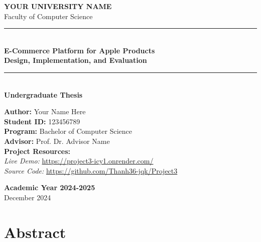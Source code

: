 \documentclass[12pt, a4paper]{report}
\begin{document}

\begin{titlepage}
    \centering
    \vspace*{2cm}
    
    {\LARGE \textbf{YOUR UNIVERSITY NAME}}\\[0.5cm]
    {\large Faculty of Computer Science}\\[2cm]
    
    \rule{\textwidth}{1.5pt}\\[0.4cm]
    {\Huge \textbf{E-Commerce Platform for Apple Products}}\\[0.2cm]
    {\Large \textbf{Design, Implementation, and Evaluation}}\\[0.4cm]
    \rule{\textwidth}{1.5pt}\\[2cm]
    
    {\Large \textbf{Undergraduate Thesis}}\\[1cm]
    
    \begin{flushleft}
        \large
        \textbf{Author:} Your Name Here\\
        \textbf{Student ID:} 123456789\\
        \textbf{Program:} Bachelor of Computer Science\\
        \textbf{Advisor:} Prof. Dr. Advisor Name\\[0.5cm]
        
        \textbf{Project Resources:}\\
        \textit{Live Demo:} \url{https://project3-icy1.onrender.com/}\\
        \textit{Source Code:} \url{https://github.com/Thanh36-jqk/Project3}\\
    \end{flushleft}
    
    \vfill
    
    {\large \textbf{Academic Year 2024-2025}}\\
    {\large December 2024}
    
\end{titlepage}

\chapter*{Abstract}
\end{document}
